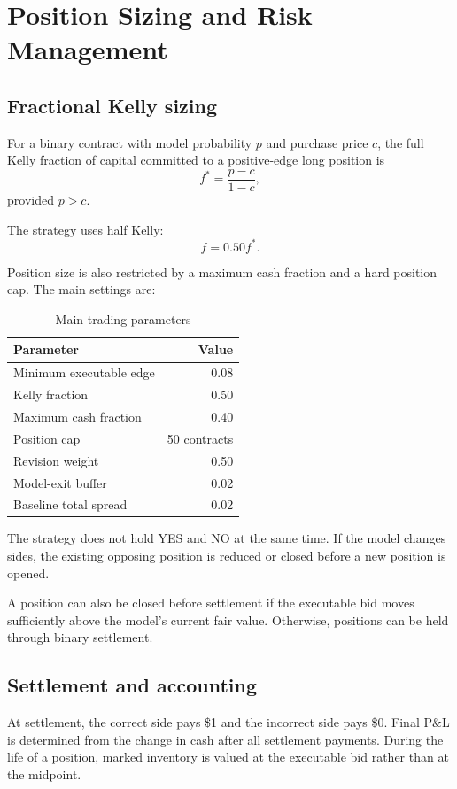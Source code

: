 \documentclass[11pt]{article}
\begin{document}
\section{Position Sizing and Risk Management}

\subsection{Fractional Kelly sizing}

For a binary contract with model probability $p$ and purchase price $c$, the full Kelly fraction of capital committed to a positive-edge long position is
\[
f^* = \frac{p-c}{1-c},
\]
provided $p>c$.

The strategy uses half Kelly:
\[
f = 0.50 f^*.
\]

Position size is also restricted by a maximum cash fraction and a hard position cap. The main settings are:

\begin{table}[H]
\centering
\caption{Main trading parameters}
\begin{tabular}{lr}
\toprule
Parameter & Value \\
\midrule
Minimum executable edge & 0.08 \\
Kelly fraction & 0.50 \\
Maximum cash fraction & 0.40 \\
Position cap & 50 contracts \\
Revision weight & 0.50 \\
Model-exit buffer & 0.02 \\
Baseline total spread & 0.02 \\
\bottomrule
\end{tabular}
\end{table}

The strategy does not hold YES and NO at the same time. If the model changes sides, the existing opposing position is reduced or closed before a new position is opened.

A position can also be closed before settlement if the executable bid moves sufficiently above the model's current fair value. Otherwise, positions can be held through binary settlement.

\subsection{Settlement and accounting}

At settlement, the correct side pays \$1 and the incorrect side pays \$0. Final P\&L is determined from the change in cash after all settlement payments. During the life of a position, marked inventory is valued at the executable bid rather than at the midpoint.
\end{document}
